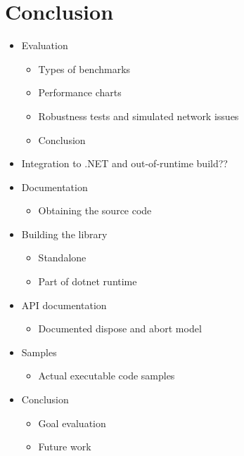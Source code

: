 \chapter{Conclusion}

\begin{itemize}

    \item Evaluation
    \begin{itemize}

        \item Types of benchmarks
        \item Performance charts
        \item Robustness tests and simulated network issues
        \item Conclusion

    \end{itemize}

    \item Integration to .NET and out-of-runtime build??

    \item Documentation
        \begin{itemize}

            \item Obtaining the source code

        \end{itemize}

        \item Building the library
        \begin{itemize}

            \item Standalone
            \item Part of dotnet runtime

        \end{itemize}

        \item API documentation
        \begin{itemize}

            \item Documented dispose and abort model

        \end{itemize}

        \item Samples
        \begin{itemize}

            \item Actual executable code samples

        \end{itemize}

    \item Conclusion
    \begin{itemize}

        \item Goal evaluation
        \item Future work

    \end{itemize}

\end{itemize}
